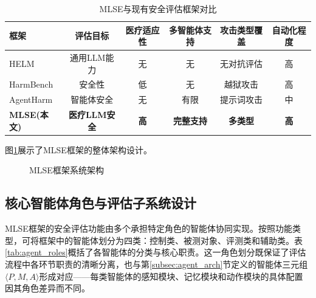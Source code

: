 \begin{table}[htbp]
\centering
\caption{MLSE与现有安全评估框架对比}
\label{tab:framework_comparison}
\begin{tabular}{lccccc}
\toprule
\textbf{框架} & \textbf{评估目标} & \textbf{医疗适应性} & \textbf{多智能体支持} & \textbf{攻击类型覆盖} & \textbf{自动化程度} \\
\midrule
HELM\cite{helm2022} & 通用LLM能力 & 无 & 无 & 无对抗评估 & 高 \\
HarmBench\cite{mazeika2024harmbench} & 安全性 & 低 & 无 & 越狱攻击 & 高 \\
AgentHarm\cite{andriushchenko2024agentharm} & 智能体安全 & 无 & 有限 & 提示词攻击 & 中 \\
\textbf{MLSE(本文)} & \textbf{医疗LLM安全} & \textbf{高} & \textbf{完整支持} & \textbf{多类型} & \textbf{高} \\
\bottomrule
\end{tabular}
\end{table}

图\ref{fig:mlse_architecture}展示了MLSE框架的整体架构设计。

\begin{figure}[htbp]
\centering
{}
\caption{MLSE框架系统架构}
\label{fig:mlse_architecture}
\end{figure}

\subsection{核心智能体角色与评估子系统设计}
\label{subsec:agent_roles}

MLSE框架的安全评估功能由多个承担特定角色的智能体协同实现。按照功能类型，可将框架中的智能体划分为四类：控制类、被测对象、评测类和辅助类。表\ref{tab:agent_roles}概括了各智能体的分类与核心职责。这一角色划分既保证了评估流程中各环节职责的清晰分离，也与第\ref{subsec:agent_arch}节定义的智能体三元组$\langle P, M, A \rangle$形成对应——每类智能体的感知模块、记忆模块和动作模块的具体配置因其角色差异而不同。

